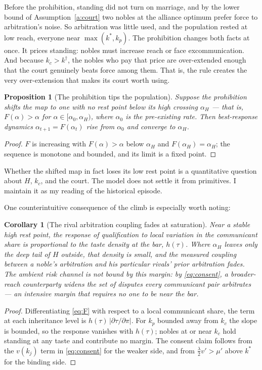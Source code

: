 \documentclass[12pt]{article}
\newtheorem{proposition}{Proposition}
\newtheorem{corollary}{Corollary}
\theoremstyle{definition}
\theoremstyle{remark}
\begin{document}
Before the prohibition, standing did not turn on marriage, and by the lower bound of Assumption~\ref{a:court} two nobles at the alliance optimum prefer force to arbitration's noise. So arbitration was little used, and the population rested at low reach, everyone near $\max(k^\ast,k_p)$. The prohibition changes both facts at once. It prices standing: nobles must increase reach or face excommunication. And because $k_c>k^\dagger$, the nobles who pay that price are over-extended enough that the court genuinely beats force among them. That is, the rule creates the very over-extension that makes its court worth using.

\begin{proposition}[The prohibition tips the population]\label{p:tip}
Suppose the prohibition shifts the map to one with no rest point below its high crossing $\alpha_H$ --- that is, $F(\alpha)>\alpha$ for $\alpha\in[\alpha_0,\alpha_H)$, where $\alpha_0$ is the pre-existing rate. Then best-response dynamics $\alpha_{t+1}=F(\alpha_t)$ rise from $\alpha_0$ and converge to $\alpha_H$.
\end{proposition}
\begin{proof}
$F$ is increasing with $F(\alpha)>\alpha$ below $\alpha_H$ and $F(\alpha_H)=\alpha_H$; the sequence is monotone and bounded, and its limit is a fixed point.
\end{proof}

Whether the shifted map in fact loses its low rest point is a quantitative question about $H$, $k_c$, and the court. The model does not settle it from primitives. I maintain it as my reading of the historical episode.

One counterintuitive consequence of the climb is especially worth noting:

\begin{corollary}[The rival arbitration coupling fades at saturation]\label{c:fade}
Near a stable high rest point, the response of qualification to local variation in the communicant share is proportional to the taste density at the bar, $h(\tau)$. Where $\alpha_H$ leaves only the deep tail of $H$ outside, that density is small, and the measured coupling between a noble's arbitration and his particular rivals' prior arbitration fades. The ambient risk channel is not bound by this margin: by \eqref{eq:consent}, a broader-reach counterparty widens the set of disputes every communicant pair arbitrates --- an intensive margin that requires no one to be near the bar.
\end{corollary}
\begin{proof}
Differentiating \eqref{eq:F} with respect to a local communicant share, the term at each inheritance level is $h(\tau)\,\lvert\partial\tau/\partial\pi\rvert$. For $k_p$ bounded away from $k_c$ the slope is bounded, so the response vanishes with $h(\tau)$; nobles at or near $k_c$ hold standing at any taste and contribute no margin. The consent claim follows from the $v(k_j)$ term in \eqref{eq:consent} for the weaker side, and from $\tfrac{\lambda}{2}v'>\mu'$ above $k^\ast$ for the binding side.
\end{proof}
\end{document}
